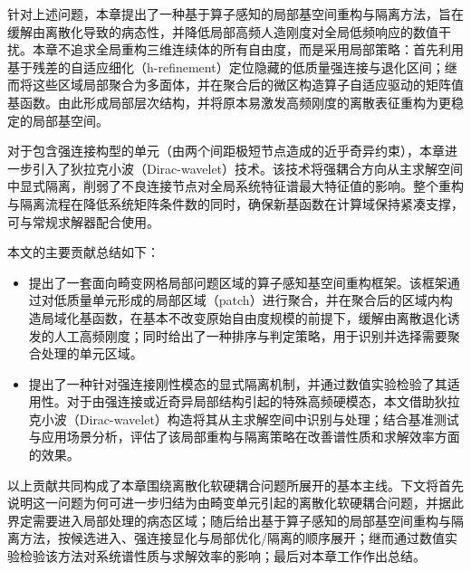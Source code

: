 针对上述问题，本章提出了一种基于算子感知的局部基空间重构与隔离方法，旨在缓解由离散化导致的病态性，并降低局部高频人造刚度对全局低频响应的数值干扰。本章不追求全局重构三维连续体的所有自由度，而是采用局部策略：首先利用基于残差的自适应细化（h-refinement）定位隐藏的低质量强连接与退化区间；继而将这些区域局部聚合为多面体，并在聚合后的微区构造算子自适应驱动的矩阵值基函数。由此形成局部层次结构，并将原本易激发高频刚度的离散表征重构为更稳定的局部基空间。

对于包含强连接构型的单元（由两个间距极短节点造成的近乎奇异约束），本章进一步引入了狄拉克小波（Dirac-wavelet）技术。该技术将强耦合方向从主求解空间中显式隔离，削弱了不良连接节点对全局系统特征谱最大特征值的影响。整个重构与隔离流程在降低系统矩阵条件数的同时，确保新基函数在计算域保持紧凑支撑，可与常规求解器配合使用。

本文的主要贡献总结如下：
\begin{itemize}
    \item 提出了一套面向畸变网格局部问题区域的算子感知基空间重构框架。该框架通过对低质量单元形成的局部区域（patch）进行聚合，并在聚合后的区域内构造局域化基函数，在基本不改变原始自由度规模的前提下，缓解由离散退化诱发的人工高频刚度；同时给出了一种排序与判定策略，用于识别并选择需要聚合处理的单元区域。
    \item 提出了一种针对强连接刚性模态的显式隔离机制，并通过数值实验检验了其适用性。对于由强连接或近奇异局部结构引起的特殊高频硬模态，本文借助狄拉克小波（Dirac-wavelet）构造将其从主求解空间中识别与处理；结合基准测试与应用场景分析，评估了该局部重构与隔离策略在改善谱性质和求解效率方面的效果。
\end{itemize}

以上贡献共同构成了本章围绕离散化软硬耦合问题所展开的基本主线。下文将首先说明这一问题为何可进一步归结为由畸变单元引起的离散化软硬耦合问题，并据此界定需要进入局部处理的病态区域；随后给出基于算子感知的局部基空间重构与隔离方法，按候选进入、强连接显化与局部优化/隔离的顺序展开；继而通过数值实验检验该方法对系统谱性质与求解效率的影响；最后对本章工作作出总结。
